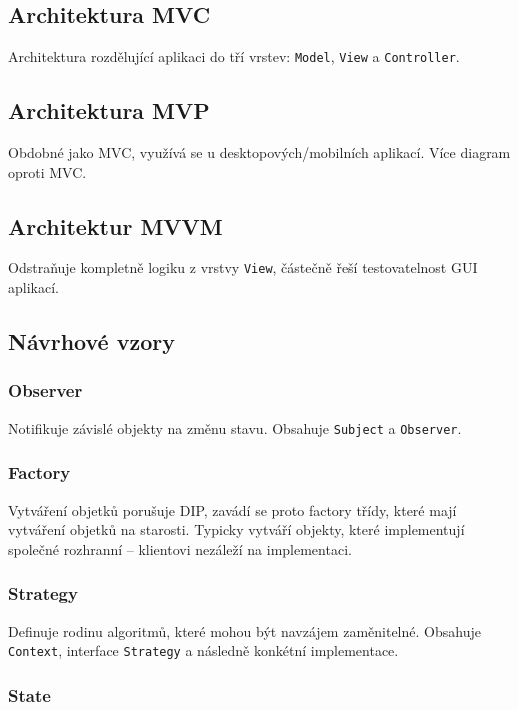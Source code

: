 \subsection{Architektura MVC}

Architektura rozdělující aplikaci do tří vrstev: \texttt{Model}, \texttt{View} a \texttt{Controller}.

\subsection{Architektura MVP}

Obdobné jako MVC, využívá se u desktopových/mobilních aplikací.
Více  diagram oproti MVC.

\subsection{Architektur MVVM}

Odstraňuje kompletně logiku z vrstvy \texttt{View}, částečně řeší testovatelnost GUI aplikací.

\subsection{Návrhové vzory}

\subsubsection{Observer}

Notifikuje závislé objekty na změnu stavu.
Obsahuje \texttt{Subject} a \texttt{Observer}.

\subsubsection{Factory}

Vytváření objetků porušuje DIP, zavádí se proto factory třídy, které mají vytváření objetků na starosti.
Typicky vytváří objekty, které implementují společné rozhranní -- klientovi nezáleží na implementaci.

\subsubsection{Strategy}

Definuje rodinu algoritmů, které mohou být navzájem zaměnitelné.
Obsahuje \texttt{Context}, interface \texttt{Strategy} a následně konkétní implementace.

\subsubsection{State}

